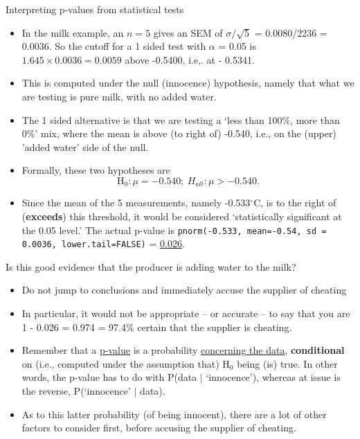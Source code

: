 \documentclass[10pt]{beamer}\usepackage[]{graphicx}\usepackage[]{color}
\begin{document}
\begin{frame}{Interpreting p-values from statistical tests}
	\begin{itemize}
		\small
		\setlength\itemsep{1em}
		\item In the milk example, an $n=5$ gives an SEM of	$\sigma/\sqrt{5}$ = 0.0080/2236 = 0.0036. So the cutoff for a 1 sided test with $\alpha$ = 0.05 is $1.645 \times 0.0036 = 0.0059$ above -0.5400,
		i.e,. at - 0.5341. 
		\item This is computed under the null (innocence) hypothesis, namely that what we are testing is pure milk, with no added water. \pause 
		\item The 1 sided alternative is that we are testing a `less than 100\%, more than 0\%' mix, where the
		mean is above (to right of) -0.540, i.e., on the (upper) 'added water' side of the null. 
		\item Formally, these two hypotheses are 
		$$\textrm{H}_0: \mu = -0.540; \  H_{alt}: \mu > -0.540.$$
		\pause 
		\item Since the mean of the 5 measurements, namely -0.533$^{\circ}$C, is to the right of (\textbf{exceeds}) this threshold, it would be considered `statistically significant at the 0.05 level.' The actual p-value is \texttt{pnorm(-0.533, mean=-0.54, sd = 0.0036, lower.tail=FALSE)} = \underline{0.026}.
	\end{itemize}
\end{frame}

\begin{frame}{Is this good evidence that the producer is adding water to the milk?}
	\begin{itemize}
		\small
		\setlength\itemsep{1em}
		\pause 
		\item Do  not jump to conclusions and immediately accuse the supplier of cheating
		\pause 
		\item In particular, it would not be appropriate -- or accurate -- to say that you are 1 - 0.026 = 0.974 = 97.4\% certain that the supplier is cheating. 
		\item Remember that a \underline{p-value} is a probability \underline{concerning the data}, \textbf{conditional} on (i.e., computed	under the  assumption that) H$_0$  being (is) true.  In other words, the p-value has to do with P(data $|$ `innocence'), whereas at issue is the reverse,  P(`innocence' $|$ data).
		\pause 
		\item As to this latter probability (of being innocent), there are a lot of other factors to consider first, before accusing the supplier of cheating.
	\end{itemize}
\end{frame}
\end{document}
